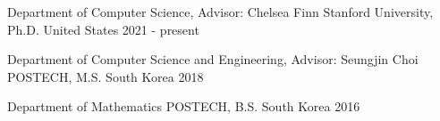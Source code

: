 

\begin{cventries}

  \cventry
    {Department of Computer Science, Advisor: Chelsea Finn}%
    {Stanford University, Ph.D.} %
    {United States} %
    {2021 - present} %
    {} \vspace{-10pt}

  \cventry
    {Department of Computer Science and Engineering, Advisor: Seungjin Choi}%
    {POSTECH, M.S.} %
    {South Korea} %
    {2018} %
    {
    } \vspace{-10pt}

  \cventry
    {Department of Mathematics}%
    {POSTECH, B.S.} %
    {South Korea} %
    {2016} %
    {} \vspace{-10pt}


\end{cventries}
